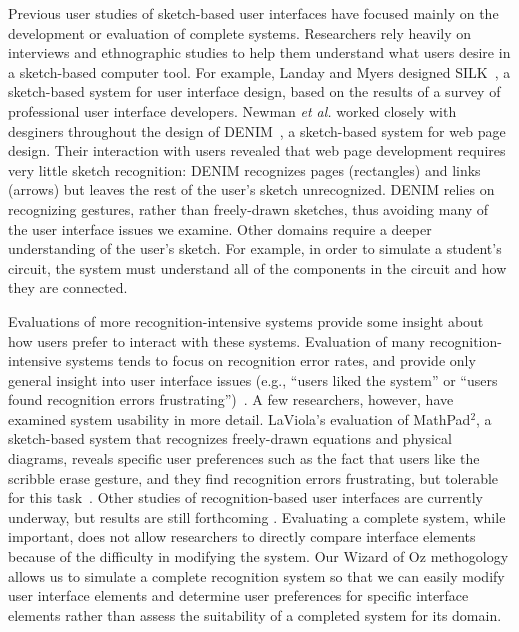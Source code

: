 \documentclass{egpubl}
\begin{document}
Previous user studies of sketch-based user interfaces have focused
mainly on the development or evaluation of complete systems.
Researchers rely heavily on interviews and ethnographic studies to
help them understand what users desire in a sketch-based computer
tool.  For example, Landay and Myers designed
SILK~\cite{landay95SILK}, a sketch-based system for user interface
design, based on the results of a survey of professional user
interface developers.  Newman \textit{et al.} worked closely with
desginers throughout the design of DENIM~\cite{Newman2003Denim}, a
sketch-based system for web page design.  Their interaction with users
revealed that web page development requires very little sketch
recognition: DENIM recognizes pages (rectangles) and links (arrows)
but leaves the rest of the user's sketch unrecognized.  DENIM relies
on recognizing gestures, rather than freely-drawn sketches, thus
avoiding many of the user interface issues we examine.  Other domains
require a deeper understanding of the user's sketch.  For example, in
order to simulate a student's circuit, the system must understand all
of the components in the circuit and how they are connected.

Evaluations of more recognition-intensive systems provide some insight
about how users prefer to interact with these systems.  Evaluation of
many recognition-intensive systems tends to focus on recognition error
rates, and provide only general insight into user interface issues
(e.g., ``users liked the system'' or ``users found recognition errors
frustrating'')~\cite{Alvarado2001Preserving,Gennari2005Combining,Hammond2002Tahuti}.
A few researchers, however, have examined system usability in more
detail.  LaViola's evaluation of MathPad$^{2}$, a sketch-based system
that recognizes freely-drawn equations and physical diagrams, reveals
specific user preferences such as the fact that users like the
scribble erase gesture, and they find recognition errors frustrating,
but tolerable for this task~\cite{LaViola2006Initial}.  Other studies
of recognition-based user interfaces are currently underway, but
results are still forthcoming
\cite{Koile2007Supporting,Tenneson2005ChemPad}.  Evaluating a complete
system, while important, does not allow researchers to directly
compare interface elements because of the difficulty in modifying the
system.  Our Wizard of Oz methogology allows us to simulate a complete
recognition system so that we can easily modify user interface
elements and determine user preferences for specific interface
elements rather than assess the suitability of a completed system for
its domain.
\end{document}
